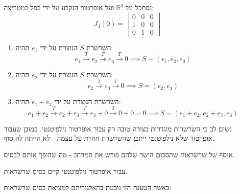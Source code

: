 \documentclass{tstextbook}
\begin{document}
\begin{example}
נסתכל על \(\mathbb{R}^{3}\) ועל אופרטור הנקבע על ידי כפל במטריצה:
$$J_{3}(0)=\left[\begin{matrix}0 & 0 & 0\\1 & 0 & 0\\0 & 1 & 0\end{matrix}\right]$$

  \begin{enumerate}
    \item השרשרת \(S\) הנוצרת על ידי \(e_{1}\) תהיה: 
$$e_{1}\xrightarrow{\;T\;} e_{2}\xrightarrow{\;T\;} e_{3}\xrightarrow{\;T\;} 0\implies S=(e_{1},e_{2},e_{3})$$


    \item השרשרת \(S\) הנוצרת על ידי \(e_{2}\) תהיה: 
$$e_{2}\xrightarrow{\;T\;} e_{3}\xrightarrow{\;T\;} 0\implies S=(e_{2},e_{3})$$


    \item השרשרת הנוצרת על ידי \(e_{1}+e_{2}\) תהיה: 
$$e_{1}+e_{2}\xrightarrow{\;T\;} e_{2}+e_{3}\xrightarrow{\;T\;} e_{3}+0\xrightarrow{\;T\;} 0+0=0\implies S=(e_{1}+e_{2},e_{2}+e_{3},e_{3})$$


  \end{enumerate}
\end{example}
\begin{remark}
נשים לב כי השרשרות מוגדרות בצורה טובה רק עבור אופרטור נילפוטנטי. במובן שעבור אופרטור שלא נילפוטנטי ייתכן שהשרשרת חוזרת על עצמה - לא הייתה לה סוף.

\end{remark}
\begin{definition}
אוסף של שרשראות שהסכום הישר שלהם פורש את המרחב - מה שהופך אותם לבסיס.

\end{definition}
\begin{proposition}
עבור אופרטור נילפוטנטי קיים בסיס שרשראות.

\end{proposition}
כאשר הטענה הזו נובעת בהאלגוריתם למציאת בסיס שרשראות:
\end{document}
